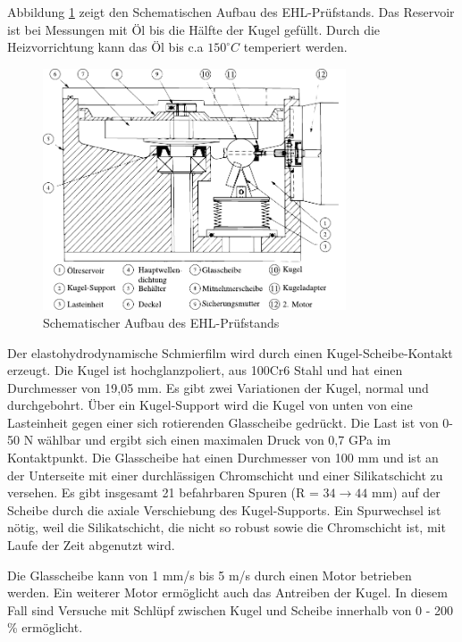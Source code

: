 Abbildung \ref{fig:ehl_aufbau} zeigt den Schematischen Aufbau des EHL-Prüfstands.
Das Reservoir ist bei Messungen mit Öl bis die Hälfte der Kugel gefüllt.
Durch die Heizvorrichtung kann das Öl bis c.a $150 ^\circ C$ temperiert werden.
\begin{figure}[htb]
    \centering
    \includegraphics[width=0.8\textwidth]{./images/ehd_pruefstand_aufbau.pdf}
    \caption{Schematischer Aufbau des EHL-Prüfstands \cite{ehl}}
    \label{fig:ehl_aufbau}
\end{figure}
%
Der elastohydrodynamische Schmierfilm wird durch einen Kugel-Scheibe-Kontakt erzeugt.
Die Kugel ist hochglanzpoliert, aus 100Cr6 Stahl und hat einen Durchmesser von 19,05 mm.
Es gibt zwei Variationen der Kugel, normal und durchgebohrt.
Über ein Kugel-Support wird die Kugel von unten von eine Lasteinheit gegen einer sich rotierenden Glasscheibe gedrückt.
Die Last ist von 0-50 N wählbar und ergibt sich einen maximalen Druck von 0,7 GPa im Kontaktpunkt.
Die Glasscheibe hat einen Durchmesser von 100 mm und ist an der Unterseite mit einer durchlässigen Chromschicht und einer Silikatschicht zu versehen.
Es gibt insgesamt 21 befahrbaren Spuren (R = $34 \rightarrow 44$ mm) auf der Scheibe durch die axiale Verschiebung des Kugel-Supports.
Ein Spurwechsel ist nötig, weil die Silikatschicht, die nicht so robust sowie die Chromschicht ist, mit Laufe der Zeit abgenutzt wird.

Die Glasscheibe kann von 1 mm/s bis 5 m/s durch einen Motor betrieben werden.
Ein weiterer Motor ermöglicht auch das Antreiben der Kugel.
In diesem Fall sind Versuche mit Schlüpf zwischen Kugel und Scheibe innerhalb von 0 - 200 \% ermöglicht.

